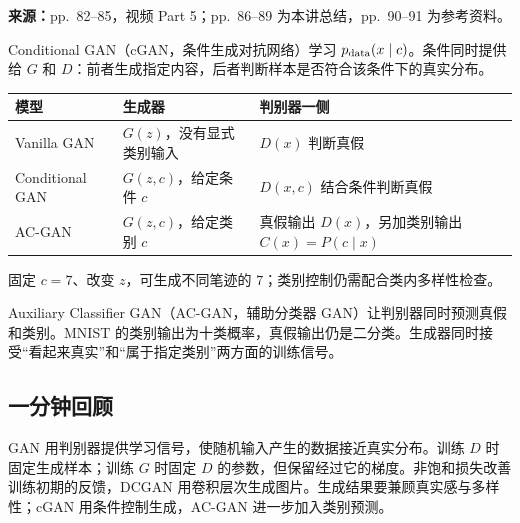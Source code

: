 \textbf{来源：}pp.~82--85，视频 Part 5；pp.~86--89 为本讲总结，pp.~90--91 为参考资料。

Conditional GAN（cGAN，条件生成对抗网络）学习 $p_{\rm data}(x\mid c)$。条件同时提供给 $G$ 和 $D$：前者生成指定内容，后者判断样本是否符合该条件下的真实分布。

\begin{center}
\small
\begin{tabularx}{\textwidth}{@{}lXX@{}}
\toprule
模型 & 生成器 & 判别器一侧 \\
\midrule
Vanilla GAN & $G(z)$，没有显式类别输入 & $D(x)$ 判断真假 \\
Conditional GAN & $G(z,c)$，给定条件 $c$ & $D(x,c)$ 结合条件判断真假 \\
AC-GAN & $G(z,c)$，给定类别 $c$ & 真假输出 $D(x)$，另加类别输出 $C(x)=P(c\mid x)$ \\
\bottomrule
\end{tabularx}
\end{center}

固定 $c=7$、改变 $z$，可生成不同笔迹的 $7$；类别控制仍需配合类内多样性检查。

Auxiliary Classifier GAN（AC-GAN，辅助分类器 GAN）让判别器同时预测真假和类别。MNIST 的类别输出为十类概率，真假输出仍是二分类。生成器同时接受“看起来真实”和“属于指定类别”两方面的训练信号。

\subsection{一分钟回顾}

GAN 用判别器提供学习信号，使随机输入产生的数据接近真实分布。训练 $D$ 时固定生成样本；训练 $G$ 时固定 $D$ 的参数，但保留经过它的梯度。非饱和损失改善训练初期的反馈，DCGAN 用卷积层次生成图片。生成结果要兼顾真实感与多样性；cGAN 用条件控制生成，AC-GAN 进一步加入类别预测。
